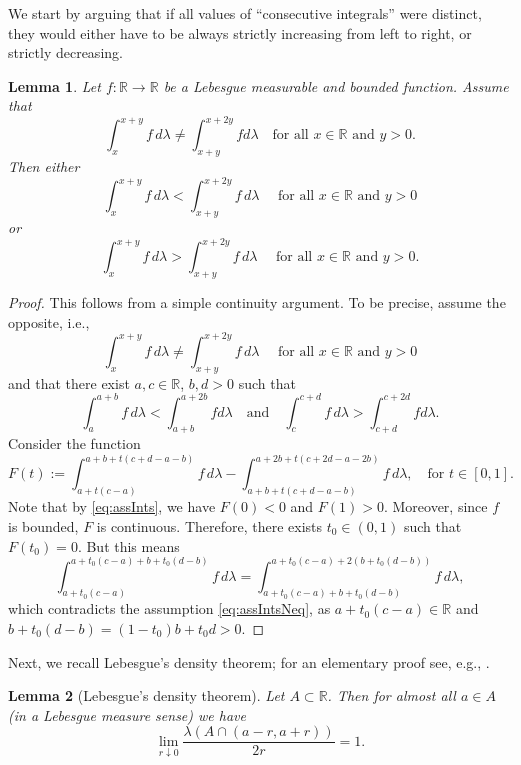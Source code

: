 \documentclass{amsart}
\theoremstyle{plain}
\newtheorem{lemma}{Lemma}
\newcommand{\R}{\mathbb{R}}
\begin{document}
We start by arguing that if all values of ``consecutive integrals''
were distinct, they would either have to be always strictly increasing from left to right, or strictly decreasing.

\begin{lemma}\label{lem:alwaysSmallerOrLarger}
Let $f \colon \R \to \R$ be a Lebesgue measurable and bounded function. Assume that 
\[
    \int_x^{x+y} f\, d \lambda \neq \int_{x+y}^{x+2y} f d \lambda
    \quad \text{for all } x\in \R \text{ and } y>0.
\]
Then either
\[
    \int_x^{x+y} f\, d \lambda 
    < \int_{x+y}^{x+2y} f\, d \lambda 
    \quad \text{ for all } x \in \R \text{ and } y>0
\]
or 
\[
    \int_x^{x+y} f\, d \lambda 
    > \int_{x+y}^{x+2y} f\, d \lambda 
    \quad \text{ for all } x \in \R \text{ and } y>0.
\]
\end{lemma}
\begin{proof}
This follows from a simple continuity argument. 
To be precise, 
assume the opposite, i.e., %
\begin{equation}\label{eq:assIntsNeq}
    \int_x^{x+y} f\, d \lambda 
    \neq \int_{x+y}^{x+2y} f\, d \lambda 
    \quad \text{ for all } x \in \R \text{ and } y>0
\end{equation}  
and that there exist $a,c \in \R$, $b,d>0$ such that
\begin{equation}\label{eq:assInts}
    \int_a^{a+b} f\, d \lambda 
    < \int_{a+b}^{a+2b} f d \lambda 
    \quad \text{and} \quad 
    \int_c^{c+d} f\, d \lambda 
    > \int_{c+d}^{c+2d} f d \lambda.
\end{equation}
Consider the function
\[
    F(t) 
    := \int_{a+t(c-a)}^{a+b+t(c+d-a-b)} f\, d \lambda - \int_{a+b+t(c+d-a-b)}^{a+2b+t(c+2d-a-2b)} f\, d \lambda,
    \quad \text{for } t \in [0,1].
\]
Note that by \eqref{eq:assInts}, we have $F(0)<0$ and $F(1)>0$. 
Moreover, since $f$ is bounded, $F$ is continuous.
Therefore, there exists $t_0 \in (0,1)$ such that $F(t_0) = 0$. But this means
\[
    \int_{a+t_0(c-a)}^{a+t_0(c-a) + b+t_0(d-b)} f\, d \lambda 
    = \int_{a+t_0(c-a) + b+t_0(d-b)}^{a+t_0(c-a) + 2(b+t_0(d-b))} f\, d \lambda,
\]
which contradicts the assumption \eqref{eq:assIntsNeq}, as $a+t_0(c-a) \in \R$ and $b+t_0(d-b) = (1-t_0)b + t_0 d >0$.
\end{proof}

Next, we recall Lebesgue's density theorem; for an elementary proof see, e.g., \cite[Appendix D]{RooijSchikhof1982}.

\begin{lemma}[Lebesgue's density theorem]\label{lem:lebDensity} 
Let $A \subset \R$. Then for almost all $a \in A$ (in a Lebesgue measure sense) we have
\[
	\lim_{r \downarrow 0} \frac{\lambda(A \cap (a-r, a+r))}{2 r} = 1.
\]
\end{lemma}
\end{document}
